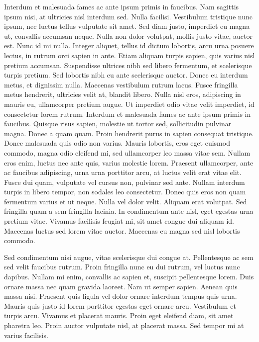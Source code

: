 \documentclass[a4paper, 12pt, twoside]{book}
\begin{document}
Interdum et malesuada fames ac ante ipsum primis in faucibus. Nam sagittis ipsum nisi, at ultricies nisl interdum sed. Nulla facilisi. Vestibulum tristique nunc ipsum, nec luctus tellus vulputate sit amet. Sed diam justo, imperdiet eu magna ut, convallis accumsan neque. Nulla non dolor volutpat, mollis justo vitae, auctor est. Nunc id mi nulla. Integer aliquet, tellus id dictum lobortis, arcu urna posuere lectus, in rutrum orci sapien in ante. Etiam aliquam turpis sapien, quis varius nisl pretium accumsan. Suspendisse ultrices nibh sed libero fermentum, et scelerisque turpis pretium. Sed lobortis nibh eu ante scelerisque auctor. Donec eu interdum metus, et dignissim nulla. Maecenas vestibulum rutrum lacus. Fusce fringilla metus hendrerit, ultricies velit at, blandit libero. Nulla nisl eros, adipiscing in mauris eu, ullamcorper pretium augue. Ut imperdiet odio vitae velit imperdiet, id consectetur lorem rutrum. Interdum et malesuada fames ac ante ipsum primis in faucibus. Quisque risus sapien, molestie ut tortor sed, sollicitudin pulvinar magna. Donec a quam quam. Proin hendrerit purus in sapien consequat tristique. Donec malesuada quis odio non varius. Mauris lobortis, eros eget euismod commodo, magna odio eleifend mi, sed ullamcorper leo massa vitae sem. Nullam eros enim, luctus nec ante quis, varius molestie lorem. Praesent ullamcorper, ante ac faucibus adipiscing, urna urna porttitor arcu, at luctus velit erat vitae elit. Fusce dui quam, vulputate vel cursus non, pulvinar sed ante. Nullam interdum turpis in libero tempor, non sodales leo consectetur. Donec quis eros non quam fermentum varius et ut neque. Nulla vel dolor velit. Aliquam erat volutpat. Sed fringilla quam a sem fringilla lacinia. In condimentum ante nisl, eget egestas urna pretium vitae. Vivamus facilisis feugiat mi, sit amet congue dui aliquam id. Maecenas luctus sed lorem vitae auctor. Maecenas eu magna sed nisl lobortis commodo.

Sed condimentum nisi augue, vitae scelerisque dui congue at. Pellentesque ac sem sed velit faucibus rutrum. Proin fringilla nunc eu dui rutrum, vel luctus nunc dapibus. Nullam mi enim, convallis ac sapien et, suscipit pellentesque lorem. Duis ornare massa nec quam gravida laoreet. Nam ut semper sapien. Aenean quis massa nisi. Praesent quis ligula vel dolor ornare interdum tempus quis urna. Mauris quis justo id lorem porttitor egestas eget ornare arcu. Vestibulum et turpis arcu. Vivamus et placerat mauris. Proin eget eleifend diam, sit amet pharetra leo. Proin auctor vulputate nisl, at placerat massa. Sed tempor mi at varius facilisis.
\end{document}
